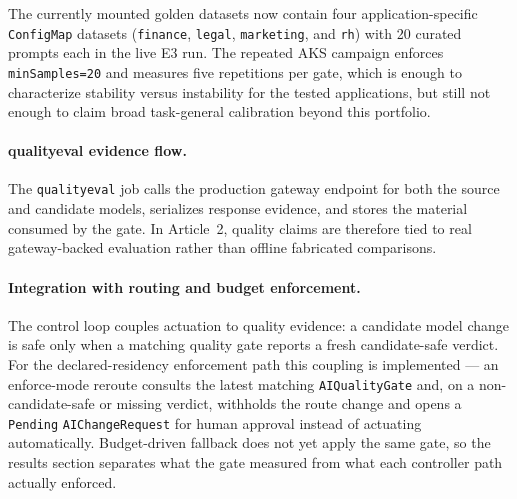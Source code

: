 The currently mounted golden datasets now contain four application-specific
\texttt{ConfigMap} datasets (\texttt{finance}, \texttt{legal},
\texttt{marketing}, and \texttt{rh}) with 20 curated prompts each in the live
E3 run. The repeated AKS campaign enforces \texttt{minSamples=20} and measures
five repetitions per gate, which is enough to characterize stability versus
instability for the tested applications, but still not enough to claim broad
task-general calibration beyond this portfolio.

\paragraph{qualityeval evidence flow.}
The \texttt{qualityeval} job calls the production gateway endpoint for both the
source and candidate models, serializes response evidence, and stores the
material consumed by the gate. In Article~2, quality claims are therefore tied
to real gateway-backed evaluation rather than offline fabricated comparisons.

\paragraph{Integration with routing and budget enforcement.}
The control loop couples actuation to quality evidence: a candidate model change
is safe only when a matching quality gate reports a fresh candidate-safe verdict.
For the declared-residency enforcement path this coupling is implemented --- an
enforce-mode reroute consults the latest matching \texttt{AIQualityGate} and, on
a non-candidate-safe or missing verdict, withholds the route change and opens a
\texttt{Pending} \texttt{AIChangeRequest} for human approval instead of actuating
automatically. Budget-driven fallback does not yet apply the same gate, so the
results section separates what the gate measured from what each controller path
actually enforced.
